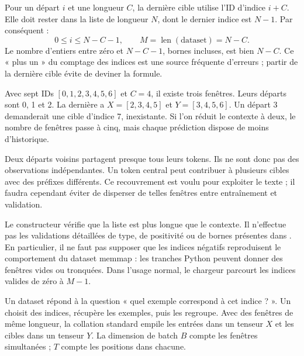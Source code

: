 Pour un départ \(i\) et une longueur \(C\), la dernière cible utilise
l'ID d'indice \(i+C\). Elle doit rester dans la liste de longueur \(N\),
dont le dernier indice est \(N-1\). Par conséquent :
\[
    0\leq i\leq N-C-1,\qquad
    M=\operatorname{len}(\mathrm{dataset})=N-C.
\]
Le nombre d'entiers entre zéro et \(N-C-1\), bornes incluses, est bien
\(N-C\). Ce « plus un » du comptage des indices est une source fréquente
d'erreurs ; partir de la dernière cible évite de deviner la formule.

Avec sept IDs \([0,1,2,3,4,5,6]\) et \(C=4\), il existe trois fenêtres.
Leurs départs sont 0, 1 et 2. La dernière a
\(X=[2,3,4,5]\) et \(Y=[3,4,5,6]\).
Un départ 3 demanderait une cible d'indice 7, inexistante.
Si l'on réduit le contexte à deux, le nombre de fenêtres passe à cinq,
mais chaque prédiction dispose de moins d'historique.

Deux départs voisins partagent presque tous leurs tokens. Ils ne sont donc
pas des observations indépendantes. Un token central peut contribuer à plusieurs
cibles avec des préfixes différents. Ce recouvrement est voulu pour exploiter
le texte ; il faudra cependant éviter de disperser de telles fenêtres
entre entraînement et validation.

Le constructeur vérifie que la liste est plus longue que le contexte.
Il n'effectue pas les validations détaillées de type, de positivité
ou de bornes présentes dans . En particulier,
il ne faut pas supposer que les indices négatifs reproduisent le comportement
du dataset memmap : les tranches Python peuvent donner des fenêtres vides
ou tronquées. Dans l'usage normal, le chargeur parcourt les indices valides
de zéro à \(M-1\).


Un dataset répond à la question « quel exemple correspond à cet indice ? ».
Un  choisit des indices, récupère les exemples, puis les
regroupe. Avec des fenêtres de même longueur, la collation standard empile
les entrées dans un tenseur \(X\) et les cibles dans un tenseur \(Y\).
La dimension de batch \(B\) compte les fenêtres simultanées ; \(T\)
compte les positions dans chacune.

